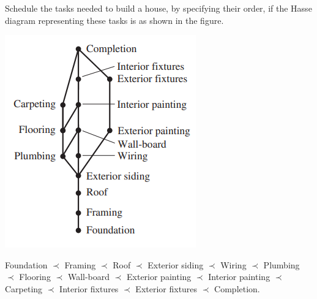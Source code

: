 \documentclass[12pt]{article}  %
\begin{document}
\noindent
Schedule the tasks needed to build a house, by specifying their order, if the Hasse diagram representing these tasks is as shown in the figure.
\begin{center}
    \includegraphics[]{images/HW12q66.PNG}
\end{center}
Foundation $\prec$ Framing $\prec$ Roof $\prec$ Exterior siding $\prec$ Wiring $\prec$ Plumbing $\prec$ Flooring $\prec$ Wall-board $\prec$ Exterior painting $\prec$ Interior painting $\prec$ Carpeting $\prec$ Interior fixtures $\prec$ Exterior fixtures $\prec$ Completion.
\end{document}

